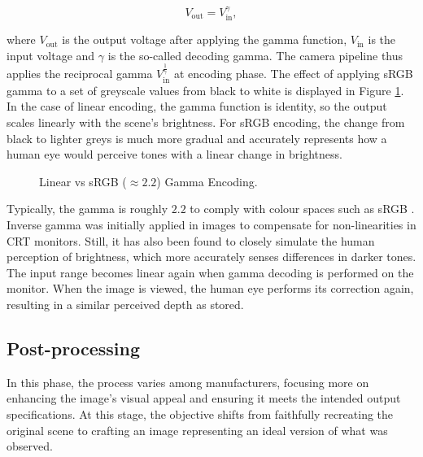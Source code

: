 \begin{equation}
V_{\text{out}} = V_{\text{in}}^\gamma,
\end{equation}

where $V_{\text{out}}$ is the output voltage after applying the gamma function, $V_{\text{in}}$ is the input voltage and $\gamma$ is the so-called decoding gamma. The camera pipeline thus applies the reciprocal gamma $V_{\text{in}}^{\frac{1}{\gamma}}$ at encoding phase. The effect of applying sRGB gamma to a set of greyscale values from black to white is displayed in Figure \ref{fig:gamma}. In the case of linear encoding, the gamma function is identity, so the output scales linearly with the scene's brightness. For sRGB encoding, the change from black to lighter greys is much more gradual and accurately represents how a human eye would perceive tones with a linear change in brightness.

\begin{figure}
    \centering
    \caption{Linear vs sRGB ($\approx 2.2$) Gamma Encoding.}
    \label{fig:gamma}
\end{figure}

Typically, the gamma is roughly $2.2$ to comply with colour spaces such as sRGB \cite{sRGB}. Inverse gamma was initially applied in images to compensate for non-linearities in CRT monitors. Still, it has also been found to closely simulate the human perception of brightness, which more accurately senses differences in darker tones. The input range becomes linear again when gamma decoding is performed on the monitor. When the image is viewed, the human eye performs its correction again, resulting in a similar perceived depth as stored.

\subsection{Post-processing}

In this phase, the process varies among manufacturers, focusing more on enhancing the image's visual appeal and ensuring it meets the intended output specifications. At this stage, the objective shifts from faithfully recreating the original scene to crafting an image representing an ideal version of what was observed.


